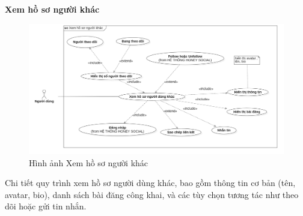 \textbf{Xem hồ sơ người khác} \\
\begin{figure}[H]
    \centering
    \includegraphics[width=1\textwidth]{image/MoHinh/9.png}
    \caption{Hình ảnh Xem hồ sơ người khác}
    \label{fig:xem_ho_so_nguoi_khac}
\end{figure}
Chi tiết quy trình xem hồ sơ người dùng khác, bao gồm thông tin cơ bản (tên, avatar, bio), danh sách bài đăng công khai, và các tùy chọn tương tác như theo dõi hoặc gửi tin nhắn.


